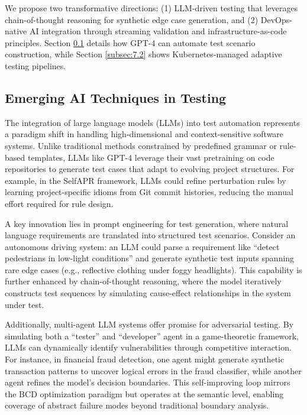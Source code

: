 \documentclass[manuscript,screen,review]{acmart}
\begin{document}
We propose two transformative directions: (1) LLM-driven testing that leverages chain-of-thought reasoning for synthetic edge case generation, and (2) DevOps-native AI integration through streaming validation and infrastructure-as-code principles. Section \ref{subsec:7.1} details how GPT-4 can automate test scenario construction, while Section \ref{subsec:7.2} shows Kubernetes-managed adaptive testing pipelines.

\subsection{Emerging AI Techniques in Testing}
\label{subsec:7.1}

The integration of large language models (LLMs) into test automation represents a paradigm shift in handling high-dimensional and context-sensitive software systems. Unlike traditional methods constrained by predefined grammar or rule-based templates, LLMs like GPT-4 leverage their vast pretraining on code repositories to generate test cases that adapt to evolving project structures. For example, in the SelfAPR framework, LLMs could refine perturbation rules by learning project-specific idioms from Git commit histories, reducing the manual effort required for rule design.

A key innovation lies in prompt engineering for test generation, where natural language requirements are translated into structured test scenarios. Consider an autonomous driving system: an LLM could parse a requirement like ``detect pedestrians in low-light conditions'' and generate synthetic test inputs spanning rare edge cases (e.g., reflective clothing under foggy headlights). This capability is further enhanced by chain-of-thought reasoning, where the model iteratively constructs test sequences by simulating cause-effect relationships in the system under test.

Additionally, multi-agent LLM systems offer promise for adversarial testing. By simulating both a ``tester'' and ``developer'' agent in a game-theoretic framework\cite{Li2018}, LLMs can dynamically identify vulnerabilities through competitive interaction. For instance, in financial fraud detection, one agent might generate synthetic transaction patterns to uncover logical errors in the fraud classifier, while another agent refines the model’s decision boundaries. This self-improving loop mirrors the BCD optimization paradigm but operates at the semantic level, enabling coverage of abstract failure modes beyond traditional boundary analysis.
\end{document}
